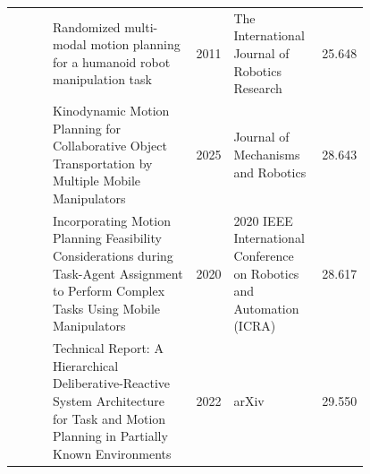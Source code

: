 \documentclass{article}
\begin{document}
\begin{center}
\begin{longtable}{p{0.12\linewidth}p{0.42\linewidth}cp{0.25\linewidth}c}
\citep{pool82_25} & Randomized multi-modal motion planning for a humanoid robot manipulation task & 2011 & The International Journal of Robotics Research & 25.648\\
\citep{pool82_26} & Kinodynamic Motion Planning for Collaborative Object Transportation by Multiple Mobile Manipulators & 2025 & Journal of Mechanisms and Robotics & 28.643\\
\citep{pool82_27} & Incorporating Motion Planning Feasibility Considerations during Task-Agent Assignment to Perform Complex Tasks Using Mobile Manipulators & 2020 & 2020 IEEE International Conference on Robotics and Automation (ICRA) & 28.617\\
\citep{pool82_28} & Technical Report: A Hierarchical Deliberative-Reactive System Architecture for Task and Motion Planning in Partially Known Environments & 2022 & arXiv & 29.550\\
\bottomrule
\end{longtable}
\normalsize
\end{center}




\end{document}
